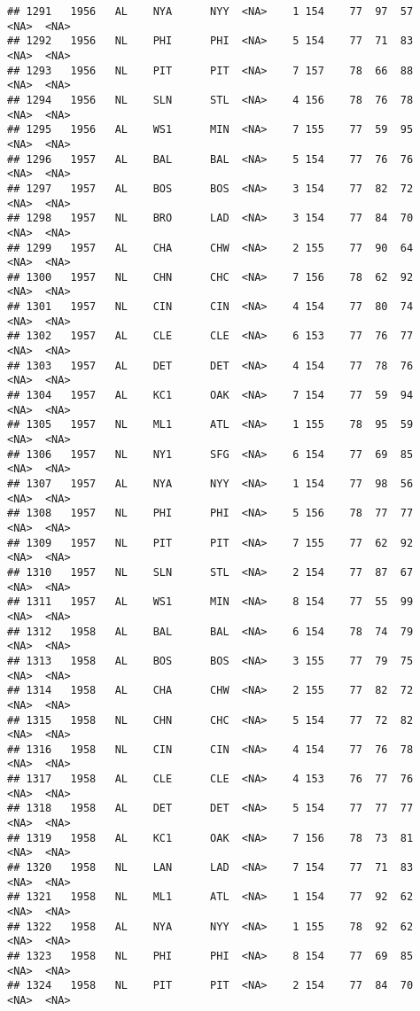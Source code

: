 \documentclass[]{article}
\begin{document}
\begin{verbatim}
## 1291   1956   AL    NYA      NYY  <NA>    1 154    77  97  57   <NA>  <NA>
## 1292   1956   NL    PHI      PHI  <NA>    5 154    77  71  83   <NA>  <NA>
## 1293   1956   NL    PIT      PIT  <NA>    7 157    78  66  88   <NA>  <NA>
## 1294   1956   NL    SLN      STL  <NA>    4 156    78  76  78   <NA>  <NA>
## 1295   1956   AL    WS1      MIN  <NA>    7 155    77  59  95   <NA>  <NA>
## 1296   1957   AL    BAL      BAL  <NA>    5 154    77  76  76   <NA>  <NA>
## 1297   1957   AL    BOS      BOS  <NA>    3 154    77  82  72   <NA>  <NA>
## 1298   1957   NL    BRO      LAD  <NA>    3 154    77  84  70   <NA>  <NA>
## 1299   1957   AL    CHA      CHW  <NA>    2 155    77  90  64   <NA>  <NA>
## 1300   1957   NL    CHN      CHC  <NA>    7 156    78  62  92   <NA>  <NA>
## 1301   1957   NL    CIN      CIN  <NA>    4 154    77  80  74   <NA>  <NA>
## 1302   1957   AL    CLE      CLE  <NA>    6 153    77  76  77   <NA>  <NA>
## 1303   1957   AL    DET      DET  <NA>    4 154    77  78  76   <NA>  <NA>
## 1304   1957   AL    KC1      OAK  <NA>    7 154    77  59  94   <NA>  <NA>
## 1305   1957   NL    ML1      ATL  <NA>    1 155    78  95  59   <NA>  <NA>
## 1306   1957   NL    NY1      SFG  <NA>    6 154    77  69  85   <NA>  <NA>
## 1307   1957   AL    NYA      NYY  <NA>    1 154    77  98  56   <NA>  <NA>
## 1308   1957   NL    PHI      PHI  <NA>    5 156    78  77  77   <NA>  <NA>
## 1309   1957   NL    PIT      PIT  <NA>    7 155    77  62  92   <NA>  <NA>
## 1310   1957   NL    SLN      STL  <NA>    2 154    77  87  67   <NA>  <NA>
## 1311   1957   AL    WS1      MIN  <NA>    8 154    77  55  99   <NA>  <NA>
## 1312   1958   AL    BAL      BAL  <NA>    6 154    78  74  79   <NA>  <NA>
## 1313   1958   AL    BOS      BOS  <NA>    3 155    77  79  75   <NA>  <NA>
## 1314   1958   AL    CHA      CHW  <NA>    2 155    77  82  72   <NA>  <NA>
## 1315   1958   NL    CHN      CHC  <NA>    5 154    77  72  82   <NA>  <NA>
## 1316   1958   NL    CIN      CIN  <NA>    4 154    77  76  78   <NA>  <NA>
## 1317   1958   AL    CLE      CLE  <NA>    4 153    76  77  76   <NA>  <NA>
## 1318   1958   AL    DET      DET  <NA>    5 154    77  77  77   <NA>  <NA>
## 1319   1958   AL    KC1      OAK  <NA>    7 156    78  73  81   <NA>  <NA>
## 1320   1958   NL    LAN      LAD  <NA>    7 154    77  71  83   <NA>  <NA>
## 1321   1958   NL    ML1      ATL  <NA>    1 154    77  92  62   <NA>  <NA>
## 1322   1958   AL    NYA      NYY  <NA>    1 155    78  92  62   <NA>  <NA>
## 1323   1958   NL    PHI      PHI  <NA>    8 154    77  69  85   <NA>  <NA>
## 1324   1958   NL    PIT      PIT  <NA>    2 154    77  84  70   <NA>  <NA>

\end{verbatim}
\end{document}
